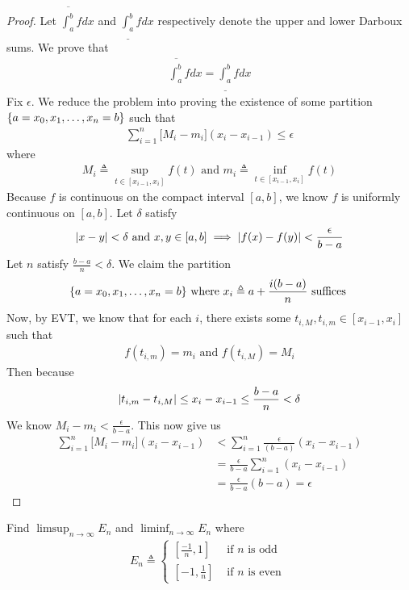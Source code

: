 \documentclass{report}
\begin{document}
\begin{proof}
Let $\overline{\int_a^b}fdx$ and $\underline{\int_a^b}fdx$ respectively denote the upper and lower Darboux sums. We prove that 
\begin{align*}
\overline{\int_a^b}fdx=\underline{\int_a^b}fdx
\end{align*}
Fix $\epsilon $. We reduce the problem into proving the existence of some partition $\{ a=x_0,x_1,\dots ,x_n=b \}$ such that  
\begin{align*}
  \sum_{i=1}^n \Big[M_i-m_i \Big](x_i-x_{i-1}) \leq \epsilon 
\end{align*}
where 
\begin{align*}
M_i\triangleq \sup_{t \in [x_{i-1},x_i]}f(t)\text{ and }m_i \triangleq \inf_{t \in [x_{i-1},x_i]}f(t)
\end{align*}
Because $f$ is continuous on the compact interval $[a,b]$, we know $f$ is uniformly continuous on $[a,b]$. Let $\delta$ satisfy 
\begin{align*}
\left|x-y\right|< \delta \text{ and }x,y \in [a,b] \implies \left|f(x)-f(y)\right|< \frac{\epsilon }{b-a}
\end{align*}
Let $n$ satisfy $\frac{b-a }{n}<\delta$. We claim the partition 
\begin{align*}
\{ a=x_0,x_1,\dots ,x_n=b \}\text{ where }x_i\triangleq a+\frac{i(b-a)}{n}\text{ suffices }
\end{align*}
Now, by EVT, we know that for each $i$, there exists some  $t_{i,M},t_{i,m} \in [x_{i-1},x_i]$ such that 
\begin{align*}
f(t_{i,m})=m_i\text{ and }f(t_{i,M})=M_i
\end{align*}
Then because 
\begin{align*}
\left|t_{i,m}-t_{i,M}\right|\leq x_i-x_{i-1}\leq \frac{b-a}{n}<\delta 
\end{align*}
We know $M_i-m_i< \frac{\epsilon}{b-a}$. This now give us 
\begin{align*}
  \sum_{i=1}^n \Big[M_i-m_i \Big](x_i-x_{i-1})&< \sum_{i=1}^n \frac{\epsilon }{(b-a)}(x_i-x_{i-1})\\
  &= \frac{\epsilon }{b-a}\sum_{i=1}^n (x_i-x_{i-1})\\
  &=\frac{\epsilon}{b-a}(b-a)=\epsilon 
\end{align*}



\end{proof}
\begin{question}{}{}
Find $\limsup_{n\to\infty} E_n$ and $\liminf_{n\to\infty} E_n$ where 
\begin{align*}
E_n\triangleq \begin{cases}
  [\frac{-1}{n},1]& \text{ if $n$ is odd }\\
  [-1,\frac{1}{n}]& \text{ if $n$ is even }
\end{cases}
\end{align*}
\end{question}
\end{document}
